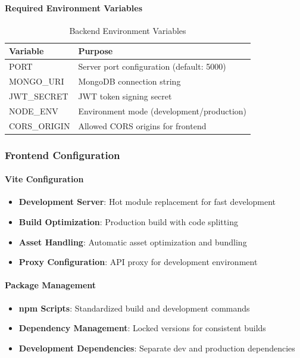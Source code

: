 \documentclass[12pt,a4paper]{article}
\begin{document}
\paragraph{Required Environment Variables}
\begin{table}[H]
\centering
\small
\begin{tabular}{@{}ll@{}}
\toprule
\textbf{Variable} & \textbf{Purpose} \\
\midrule
PORT & Server port configuration (default: 5000) \\
MONGO\_URI & MongoDB connection string \\
JWT\_SECRET & JWT token signing secret \\
NODE\_ENV & Environment mode (development/production) \\
CORS\_ORIGIN & Allowed CORS origins for frontend \\
\bottomrule
\end{tabular}
\caption{Backend Environment Variables}
\label{tab:backend-env}
\end{table}

\subsubsection{Frontend Configuration}
\label{subsubsec:frontend-config}

\paragraph{Vite Configuration}
\begin{itemize}
\item \textbf{Development Server}: Hot module replacement for fast development
\item \textbf{Build Optimization}: Production build with code splitting
\item \textbf{Asset Handling}: Automatic asset optimization and bundling
\item \textbf{Proxy Configuration}: API proxy for development environment
\end{itemize}

\paragraph{Package Management}
\begin{itemize}
\item \textbf{npm Scripts}: Standardized build and development commands
\item \textbf{Dependency Management}: Locked versions for consistent builds
\item \textbf{Development Dependencies}: Separate dev and production dependencies
\end{itemize}
\end{document}
